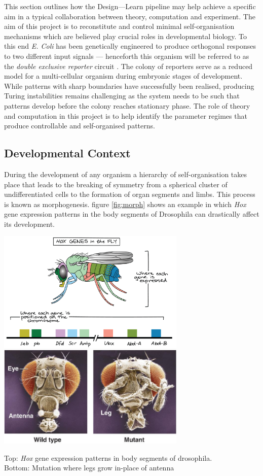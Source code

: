 This section outlines how the Design---Learn pipeline may help achieve a specific
aim in a typical collaboration between theory, computation and experiment.
The aim of this project is to reconstitute and control minimal self-organisation
mechanisms which are believed play crucial roles in developmental biology. To this
end \textit{E. Coli} has been genetically engineered to produce orthogonal responses
to two different input signals --- henceforth this organism will be referred to as the
\textit{double exclusive reporter} circuit \cite{Grant2016}. The colony of reporters
serve as a reduced model for a multi-cellular organism during embryonic stages of
development. While patterns with sharp boundaries have successfully been realised,
producing Turing instabilities remains challenging as the system needs to be such
that patterns develop before the colony reaches stationary phase.
The role of theory and computation in this project is to help identify the
parameter regimes that produce controllable and self-organised patterns.

\subsection{Developmental Context}
During the development of any organism a hierarchy of self-organisation takes place that leads
to the breaking of symmetry from a spherical cluster of undifferentiated cells to the formation
of organ segments and limbs. This process is known as morphogenesis. figure \ref{fig:morph}
shows an example in which \textit{Hox} gene expression patterns in the body segments of
Drosophila can drastically affect its development.

\begin{Figure}
\includegraphics[width=90mm]{figures/morph1.png}\\
\includegraphics[width=90mm]{figures/morph2.png}
\caption{Top: \textit{Hox} gene expression patterns in body segments of drosophila.\\
Bottom: Mutation where legs grow in-place of antenna}
\label{fig:morph}
\end{Figure}
